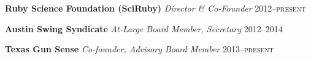 \documentclass[12pt,letterpaper]{article}
\newenvironment{itemize*}%
{\begin{itemize}%
  \setlength{\itemsep}{0pt}}%
{\end{itemize}}
\newcommand{\Cpp}{\textsc{c}\nolinebreak[4]\hspace{-.05em}\raisebox{.4ex}{\relsize{-3}{\textbf{++}}}}
\newcommand{\rdate}[1]{{\hfill #1}}
\begin{document}
\medskip
\textbf{Ruby Science Foundation (SciRuby)} \newline %
\emph{Director \& Co-Founder} \rdate{2012--\textsc{present}}

\medskip
\textbf{Austin Swing Syndicate}\newline
\emph{At-Large Board Member, Secretary} \rdate{2012--2014}%

\medskip
\textbf{Texas Gun Sense}\newline
\emph{Co-founder, Advisory Board Member} \rdate{2013--\textsc{present}}%
\end{document}
